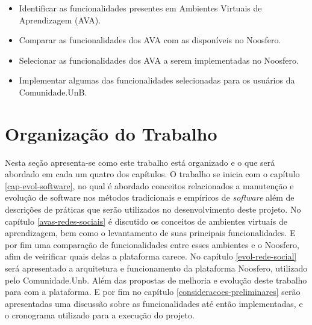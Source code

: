 \begin{itemize}
\item Identificar as funcionalidades presentes em Ambientes Virtuais de Aprendizagem (AVA).
\item Comparar as funcionalidades dos AVA com as disponíveis no Noosfero.
\item Selecionar as funcionalidades dos AVA a serem implementadas no Noosfero.
\item Implementar algumas das funcionalidades selecionadas para os usuários da Comunidade.UnB.
\end{itemize}

\section{Organização do Trabalho}

Nesta seção apresenta-se como este trabalho está organizado e o que será abordado em cada um quatro dos capítulos. O trabalho se inicia com o capítulo \ref{cap-evol-software}, no qual é abordado conceitos relacionados a manutenção e evolução de software nos métodos tradicionais e empíricos de \textit{software} além de descrições de práticas que serão utilizados no desenvolvimento deste projeto. No capítulo \ref{avas-redes-sociais} é discutido os conceitos de ambientes virtuais de aprendizagem, bem como o levantamento de suas principais funcionalidades. E por fim uma comparação de funcionalidades entre esses ambientes e o Noosfero, afim de veirificar quais delas a plataforma carece. No capítulo \ref{evol-rede-social} será apresentado a arquitetura e funcionamento da plataforma Noosfero, utilizado pelo Comunidade.Unb. Além das propostas de melhoria e evolução deste trabalho para com a plataforma. E por fim no capítulo \ref{consideracoes-preliminares} serão apresentadas uma discussão sobre as funcionalidades até então implementadas, e o cronograma utilizado para a execução do projeto.